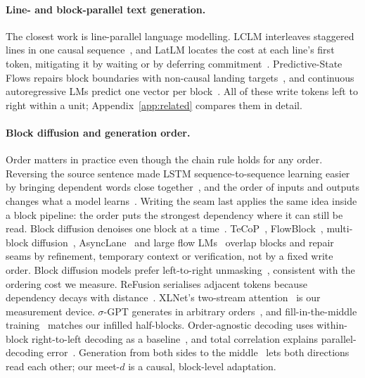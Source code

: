\documentclass[11pt]{article}
\theoremstyle{definition}
\theoremstyle{remark}
\newcommand{\sch}[1]{\textsf{#1}}
\begin{document}
\paragraph{Line- and block-parallel text generation.}
The closest work is line-parallel language modelling.
LCLM interleaves staggered lines in one causal sequence~\citep{li2026lclm}, and LatLM locates the cost at each line's first token, mitigating it by waiting or by deferring commitment~\citep{zhang2026latlm}.
Predictive-State Flows repairs block boundaries with non-causal landing targets~\citep{he2026psf}, and continuous autoregressive LMs predict one vector per block~\citep{shao2025calm}.
All of these write tokens left to right within a unit; Appendix~\ref{app:related} compares them in detail.

\paragraph{Block diffusion and generation order.}
Order matters in practice even though the chain rule holds for any order.
Reversing the source sentence made LSTM sequence-to-sequence learning easier by bringing dependent words close together~\citep{sutskever2014seq2seq}, and the order of inputs and outputs changes what a model learns~\citep{vinyals2016order}.
Writing the seam last applies the same idea inside a block pipeline: the order puts the strongest dependency where it can still be read.
Block diffusion denoises one block at a time~\citep{arriola2025block}.
TeCoP~\citep{tsou2026tecop}, FlowBlock~\citep{tian2026flowblock}, multi-block diffusion~\citep{jin2026multibd}, AsyncLane~\citep{ren2026asynclane} and large flow LMs~\citep{chavan2026lafa} overlap blocks and repair seams by refinement, temporary context or verification, not by a fixed write order.
Block diffusion models prefer left-to-right unmasking~\citep{hou2026rethinking}, consistent with the ordering cost we measure.
ReFusion serialises adjacent tokens because dependency decays with distance~\citep{li2025refusion}.
XLNet's two-stream attention~\citep{yang2019xlnet} is our measurement device.
$\sigma$-GPT generates in arbitrary orders~\citep{pannatier2024sigma}, and fill-in-the-middle training~\citep{bavarian2022fim} matches our infilled half-blocks.
Order-agnostic decoding uses within-block right-to-left decoding as a baseline~\citep{yao2026orderagnostic}, and total correlation explains parallel-decoding error~\citep{zhang2026generation}.
Generation from both sides to the middle~\citep{zhou2019bothsides,zhou2019sbnmt,zhang2020interleaved,nguyen2023meet} lets both directions read each other; our \sch{meet-$d$} is a causal, block-level adaptation.
\end{document}
